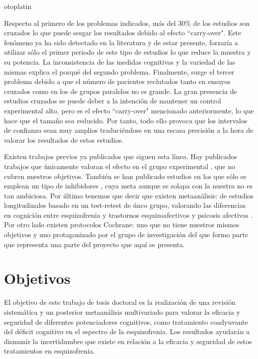 otoplatin\documentclass[a4paper,openright,12pt]{report}
\begin{document}
Respecto al primero de los problemas indicados, más del 30\% de los estudios son cruzados lo que puede sesgar los resultados debido al efecto ``carry-over". Este fenómeno ya ha sido detectado en la literatura \cite{Ballesteros2008} y de estar presente, forzaría a utilizar sólo el primer periodo de este tipo de estudios lo que reduce la muestra y su potencia. La inconsistencia de las medidas cognitivas y la variedad de las mismas explica el porqué del segundo problema. Finalmente, surge el tercer problema debido a que el número de pacientes reclutados tanto en ensayos cruzados como en los de grupos paralelos no es grande. La gran presencia de estudios cruzados se puede deber a la intención de mantener un control experimental alto, pero es el efecto ``carry-over" mencionado anteriormente, lo que hace que el tamaño sea reducido. Por tanto, todo ello provoca que los intervalos de confianza sean muy amplios traduciéndose en una escasa precisión a la hora de valorar los resultados de estos estudios.

Existen trabajos previos ya publicados que siguen esta línea. Hay publicados trabajos que únicamente valoran el efecto en el grupo experimental \cite{Chourinard2007}\cite{Stip2007}, que no cubren nuestros objetivos. También se han publicado estudios en los que sólo se emplean un tipo de inhibidores \cite{Ribeiz2010}, cuya meta aunque se solapa con la nuestra no es tan ambiciosa. Por último tenemos que decir que existen metaanálisis: de estudios longitudinales \cite{Szoke2008} basado en un test-retest de únco grupo, valorando las diferencias en cognición entre esquizofrenia y trastornos esquizoafectivos y psicosis afectivas \cite{Bora2009}. Por otro lado existen protocolos Cochrane: uno que no tiene nuestros mismos objetivos \cite{Singh2009} y uno protagonizado por el grupo de investigación del que formo parte que representa una parte del proyecto que aquí se presenta. 

\section{Objetivos}
El objetivo de este trabajo de tesis doctoral es la realización de una revisión sistemática y un posterior metaanálisis multivariado para valorar la eficacia y seguridad de diferentes potenciadores cognitivos, como tratamiento coadyuvante del déficit cognitivo en el espectro de la esquizofrenia. Los resultados ayudarán a dismunir la incertidumbre que existe en relación a la eficacia y seguridad de estos tratamientos en esquizofrenia.
\end{document}
